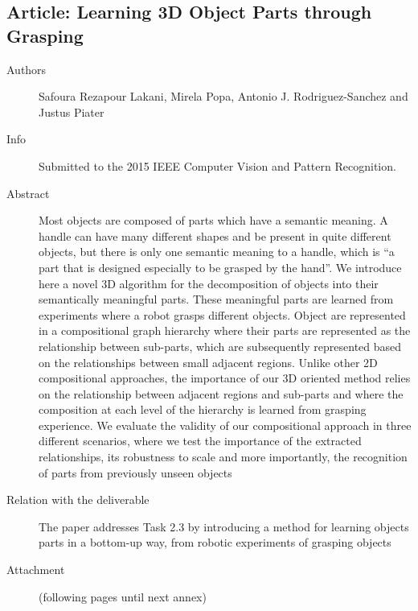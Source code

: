 \documentclass[a4paper,11pt,pdf]{pacmanreport}
\begin{document}
\subsection{Article: Learning 3D Object Parts through Grasping} \label{ann:icra}
\begin{description}
	\item[Authors] Safoura Rezapour Lakani, Mirela Popa, Antonio J. Rodriguez-Sanchez and Justus Piater
	\item[Info] Submitted to the 2015 IEEE Computer Vision and Pattern Recognition. 
	\item[Abstract] Most objects are composed of parts which have a semantic meaning. A handle can have many different shapes and be present in quite different objects, but there is only one semantic meaning to a handle, which is ``a part that is designed especially to be grasped by the hand''. We introduce here a novel 3D algorithm for the decomposition of objects into their semantically meaningful parts. These meaningful parts are learned from experiments where a robot grasps different objects. Object are represented in a compositional graph hierarchy where their parts are represented as the relationship between sub-parts, which are subsequently represented based on the relationships between small adjacent regions. Unlike other 2D compositional approaches, the importance of our 3D oriented method relies on the relationship between adjacent regions and sub-parts and where the composition at each level of the hierarchy is learned from grasping experience. We evaluate the validity of our compositional approach in three different scenarios, where we test the importance of the extracted relationships, its robustness to scale and more importantly, the recognition of parts from previously unseen objects
	\item[Relation with the deliverable] The paper addresses Task 2.3 by introducing a method for learning objects parts in a bottom-up way, from robotic experiments of grasping objects
    \item[Attachment] (following pages until next annex)
\end{description}

\end{document}
